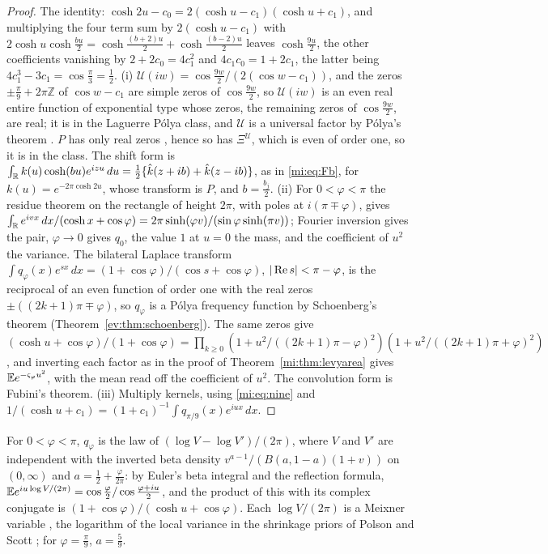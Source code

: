 \begin{proof}
The identity: $\cosh2u-c_0=2(\cosh u-c_1)(\cosh u+c_1)$, and multiplying the four term sum by $2(\cosh u-c_1)$ with $2\cosh u\cosh\frac{bu}2=\cosh\frac{(b+2)u}2+\cosh\frac{(b-2)u}2$ leaves $\cosh\frac{9u}2$, the other coefficients vanishing by $2+2c_0=4c_1^2$ and $4c_1c_0=1+2c_1$, the latter being $4c_1^3-3c_1=\cos\frac\pi3=\frac12$. (i) $\mathcal U(iw)=\cos\frac{9w}2/(2(\cos w-c_1))$, and the zeros $\pm\frac\pi9+2\pi\mathbb Z$ of $\cos w-c_1$ are simple zeros of $\cos\frac{9w}2$, so $\mathcal U(iw)$ is an even real entire function of exponential type whose zeros, the remaining zeros of $\cos\frac{9w}2$, are real; it is in the Laguerre P\'olya class, and $\mathcal U$ is a universal factor by P\'olya's theorem \cite{Polya27}. $P$ has only real zeros \cite{Polya}, hence so has $\Xi^{\mathcal U}$, which is even of order one, so it is in the class. The shift form is $\int_{\mathbb{R}} k(u)\cosh(bu)e^{izu}\,du=\frac12\{\hat k(z+ib)+\hat k(z-ib)\}$, as in \eqref{mi:eq:Fb}, for $k(u)=e^{-2\pi\cosh2u}$, whose transform is $P$, and $b=\frac{b_j}2$. (ii) For $0<\varphi<\pi$ the residue theorem on the rectangle of height $2\pi$, with poles at $i(\pi\mp\varphi)$, gives $\int_{\mathbb{R}} e^{ivx}\,dx/(\cosh x+\cos\varphi)=2\pi\sinh(\varphi v)/(\sin\varphi\sinh(\pi v))$; Fourier inversion gives the pair, $\varphi\to0$ gives $q_0$, the value $1$ at $u=0$ the mass, and the coefficient of $u^2$ the variance. The bilateral Laplace transform $\int q_\varphi(x)e^{sx}\,dx=(1+\cos\varphi)/(\cos s+\cos\varphi)$, $|\operatorname{Re} s|<\pi-\varphi$, is the reciprocal of an even function of order one with the real zeros $\pm((2k+1)\pi\mp\varphi)$, so $q_\varphi$ is a P\'olya frequency function by Schoenberg's theorem \cite{Schoenberg51} (Theorem~\ref{ev:thm:schoenberg}). The same zeros give $(\cosh u+\cos\varphi)/(1+\cos\varphi)=\prod_{k\ge0}(1+u^2/((2k+1)\pi-\varphi)^2)(1+u^2/((2k+1)\pi+\varphi)^2)$, and inverting each factor as in the proof of Theorem~\ref{mi:thm:levyarea} gives $\mathbb{E} e^{-\varsigma_\varphi u^2}$, with the mean read off the coefficient of $u^2$. The convolution form is Fubini's theorem. (iii) Multiply kernels, using \eqref{mi:eq:nine} and $1/(\cosh u+c_1)=(1+c_1)^{-1}\int q_{\pi/9}(x)e^{iux}\,dx$.
\end{proof}

For $0<\varphi<\pi$, $q_\varphi$ is the law of $(\log V-\log V')/(2\pi)$, where $V$ and $V'$ are independent with the inverted beta density $v^{a-1}/(B(a,1-a)(1+v))$ on $(0,\infty)$ and $a=\frac12+\frac\varphi{2\pi}$: by Euler's beta integral and the reflection formula, $\mathbb{E} e^{iu\log V/(2\pi)}=\cos\frac\varphi2/\cos\frac{\varphi+iu}2$, and the product of this with its complex conjugate is $(1+\cos\varphi)/(\cosh u+\cos\varphi)$. Each $\log V/(2\pi)$ is a Meixner variable \cite{Grigelionis99}, the logarithm of the local variance in the shrinkage priors of Polson and Scott \cite{PolsonScott12}; for $\varphi=\frac\pi9$, $a=\frac59$.

